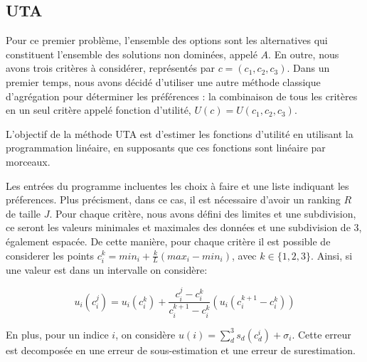 \documentclass[12pt, a4paper, french, version=last, parskip=half, titlepage]{scrartcl}
\begin{document}
\subsection{UTA}

Pour ce premier problème, l'ensemble des options sont les alternatives qui constituent l'ensemble des solutions non dominées, appelé $A$. En outre, nous avons trois critères à considérer, représentés par $c = (c_1, c_2, c_3)$. Dans un premier temps, nous avons décidé d'utiliser une autre méthode classique d'agrégation pour déterminer les préférences : la combinaison de tous les critères en un seul critère appelé fonction d'utilité, $U(c) = U(c_1, c_2, c_3)$.


    

L'objectif de la méthode UTA est d'estimer les fonctions d'utilité en utilisant la programmation linéaire, en supposants que ces fonctions sont linéaire par morceaux.

Les entrées du programme incluentes les choix à faire et une liste indiquant les préferences. Plus précisment, dans ce cas, il est nécessaire d'avoir un ranking $R$ de taille $J$. Pour chaque critère, nous avons défini des limites et une subdivision, ce seront les valeurs minimales et maximales des données et une subdivision de 3, également espacée. De cette manière, pour chaque critère il est possible de considerer les points $c_i^k = min_i + \frac{k}{L} (max_i - min_i)$, avec $k \in \{1, 2, 3\}$. Ainsi, si une valeur est dans un intervalle on considère:

\begin{equation*}
    u_i(c_i^j)= u_i(c_i^k) + \frac{c_i^j - c_i^k}{c_i^{k+1} - c_i^k}(u_i(c_i^{k+1} - c_i^k))
\end{equation*}

En plus, pour un indice $i$, on considère $u(i) = \sum_{d}^3s_d(c_d^i) + \sigma_i$. Cette erreur est decomposée en une erreur de sous-estimation et une erreur de surestimation.
\end{document}
